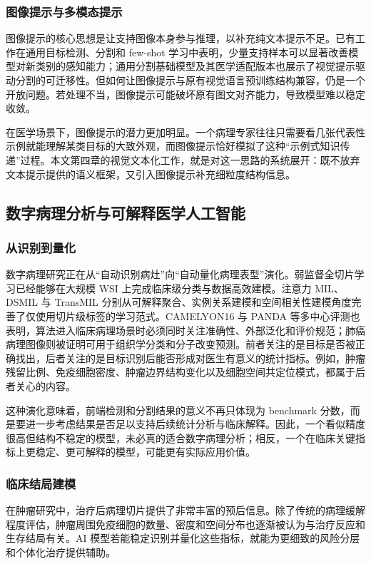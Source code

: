 \subsubsection{图像提示与多模态提示}
图像提示的核心思想是让支持图像本身参与推理，以补充纯文本提示不足。已有工作在通用目标检测、分割和 few-shot 学习中表明，少量支持样本可以显著改善模型对新类别的感知能力；通用分割基础模型及其医学适配版本也展示了视觉提示驱动分割的可迁移性\cite{kirillov2023sam,ma2024medsam}。但如何让图像提示与原有视觉语言预训练结构兼容，仍是一个开放问题。若处理不当，图像提示可能破坏原有图文对齐能力，导致模型难以稳定收敛。

在医学场景下，图像提示的潜力更加明显。一个病理专家往往只需要看几张代表性示例就能理解某类目标的大致外观，而图像提示恰好模拟了这种“示例式知识传递”过程。本文第四章的视觉文本化工作，就是对这一思路的系统展开：既不放弃文本提示提供的语义框架，又引入图像提示补充细粒度结构信息。

\subsection{数字病理分析与可解释医学人工智能}
\subsubsection{从识别到量化}
数字病理研究正在从“自动识别病灶”向“自动量化病理表型”演化。弱监督全切片学习已经能够在大规模 WSI 上完成临床级分类与数据高效建模\cite{campanella2019clinical,lu2021clam}。注意力 MIL、DSMIL 与 TransMIL 分别从可解释聚合、实例关系建模和空间相关性建模角度完善了仅使用切片级标签的学习范式\cite{ilse2018attentionmil,li2021dsmil,shao2021transmil}。CAMELYON16 与 PANDA 等多中心评测也表明，算法进入临床病理场景时必须同时关注准确性、外部泛化和评价规范\cite{bejnordi2017camelyon,bulten2022panda}；肺癌病理图像则被证明可用于组织学分类和分子改变预测\cite{coudray2018lung}。前者关注的是目标是否被正确找出，后者关注的是目标识别后能否形成对医生有意义的统计指标。例如，肿瘤残留比例、免疫细胞密度、肿瘤边界结构变化以及细胞空间共定位模式，都属于后者关心的内容。

这种演化意味着，前端检测和分割结果的意义不再只体现为 benchmark 分数，而是要进一步考虑结果是否足以支持后续统计分析与临床解释。因此，一个看似精度很高但结构不稳定的模型，未必真的适合数字病理分析；相反，一个在临床关键指标上更稳定、更可解释的模型，可能更有实际应用价值。

\subsubsection{临床结局建模}
在肿瘤研究中，治疗后病理切片提供了非常丰富的预后信息。除了传统的病理缓解程度评估，肿瘤周围免疫细胞的数量、密度和空间分布也逐渐被认为与治疗反应和生存结局有关。AI 模型若能稳定识别并量化这些指标，就能为更细致的风险分层和个体化治疗提供辅助。

